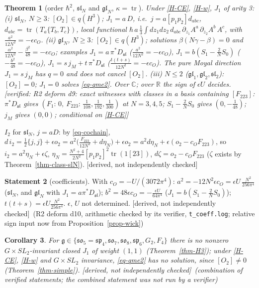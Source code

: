 \documentclass[10pt,a4paper]{article}
\numberwithin{equation}{section}
\newtheorem{theorem}{Theorem}[section]
\newtheorem{corollary}[theorem]{Corollary}
\theoremstyle{definition}
\newtheorem{dstatement}[theorem]{Statement}
\theoremstyle{remark}
\newcommand{\tr}{\operatorname{tr}}
\newcommand{\g}{\mathfrak g}
\newcommand{\fsl}{\mathfrak{sl}}
\newcommand{\fgl}{\mathfrak{gl}}
\newcommand{\fso}{\mathfrak{so}}
\newcommand{\fsp}{\mathfrak{sp}}
\newcommand{\ver}[1]{\textup{[verified: #1]}}
\newcommand{\der}{\textup{[derived, not independently checked]}}
\begin{document}
\begin{theorem}[order $\hbar^2$, $\fsl_N$ and $\fgl_N$, $\kappa=\tr$]\label{thm-Q1}
Under \ref{H-CE}, \ref{H-w}, $J_1$ of arity 3:
(i) $\fsl_N$, $N\ge3$: $[O_2]\in q(H^3)$; $J_1=a\,D$, i.e.\ $j=a[p_1p_2]d_{abc}$, $d_{abc}=\tr(T_a\{T_b,T_c\})$, local functional $\hbar\,a\,\frac13\int dz_1dz_2\,d_{abc}\,\partial_{z_1}A^a\,\partial_{z_2}A^b\,A^c$, with $\frac{a^2}{12N^2}=-\epsilon c_O$.
(ii) $\fgl_N$, $N\ge3$: $[O_2]\in q(H^3)$; solutions $\beta(N\gamma-\beta)=0$ and $\frac{\alpha^2}{12N^2}-\frac{\beta^2}{48}=-\epsilon c_O$; examples $J_1=a\,\pi^*D_{\fsl}$ ($\frac{a^2}{12N^2}=-\epsilon c_O$), $J_1=b(S_1-\frac2NS_0)$ ($-\frac{b^2}{48}=-\epsilon c_O$), $J_1=s\,j_M+t\,\pi^*D_{\fsl}$ ($\frac{t(t+s)}{12N^2}=-\epsilon c_O$). The pure Moyal direction $J_1=s\,j_M$ has $q=0$ and does not cancel $[O_2]$.
(iii) $N\le2$ ($\fgl_1,\fgl_2,\fsl_2$): $[O_2]=0$; $J_1=0$ solves \eqref{eq-qme2}.
Over $\mathbb C$; over $\mathbb R$ the sign of $\epsilon U$ decides.
\ver{R2 deform d9: exact witnesses with classes in a basis containing $[F_{223}]$: $\pi^*D_{\fsl}$ gives $(F_1{:}\,0,\ F_{223}{:}\,\frac1{108},\frac1{192},\frac1{300})$ at $N=3,4,5$; $S_1-\frac2NS_0$ gives $(0,-\frac1{48})$; $j_M$ gives $(0,0)$; conditional on \ref{H-CE}}
\end{theorem}

$I_2$ for $\fsl_N$, $j=aD$: by \eqref{eq-cochain}, $d\,i_2=\frac12\{j,j\}+\epsilon o_2=a^2\big(\frac{F_{223}}{12N^2}+d\eta_N\big)+\epsilon o_2=a^2d\eta_N+\epsilon(o_2-c_OF_{223})$, so $i_2=a^2\eta_N+\epsilon\zeta$, $\eta_N=\frac{N^2+4}{2N^2}[p_1p_2]^2\tr(1[23])$, $d\zeta=o_2-c_OF_{223}$ ($\zeta$ exists by Theorem~\ref{thm-class-slN}). \der

\begin{dstatement}[coefficients]
With $c_O=-U/(3072\pi^4)$: $a^2=-12N^2\epsilon c_O=\epsilon U\,\frac{N^2}{256\pi^4}$ ($\fsl_N$, and $\fgl_N$ with $J_1=a\pi^*D_{\fsl}$); $b^2=48\epsilon c_O=-\frac{\epsilon U}{64\pi^4}$ ($J_1=b(S_1-\frac2NS_0)$); $t(t+s)=\epsilon U\frac{N^2}{256\pi^4}$. $\epsilon$, $U$ not determined. \der\ (R2 deform d10, arithmetic checked by its verifier, \texttt{t\_coeff.log}; relative sign input now from Proposition~\ref{prop-wick})
\end{dstatement}

\begin{corollary}\label{cor-B}
For $\g\in\{\fso_5=\fsp_4,\fso_7,\fso_8,\fsp_6,G_2,F_4\}$ there is no nonzero $G\times SL_2$-invariant closed $J_1$ of weight $(1,1)$ (Theorem~\ref{thm-H3}); under \ref{H-CE}, \ref{H-w} and $G\times SL_2$ invariance, \eqref{eq-qme2} has no solution, since $[O_2]\ne0$ (Theorem~\ref{thm-simple}). \der\ (combination of verified statements; the combined statement was not run by a verifier)
\end{corollary}
\end{document}
